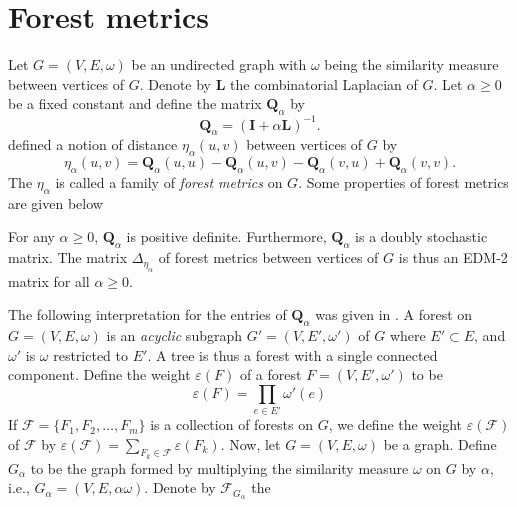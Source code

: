 \section{Forest metrics}
\label{sec:forest-metrics}
Let $G = (V,E,\omega)$ be an undirected graph with $\omega$ being the
similarity measure between vertices of $G$. Denote by $\mathbf{L}$ the
combinatorial Laplacian of $G$. Let $\alpha \geq 0$ be a fixed
constant and define the matrix $\mathbf{Q}_{\alpha}$ by
\begin{equation}
  \label{eq:30}
  \mathbf{Q}_{\alpha} = (\mathbf{I} + \alpha \mathbf{L})^{-1}.
\end{equation}
%
\citet{chebotarev02:_fores_metric_for_graph_vertic} defined a notion of
distance $\eta_\alpha(u,v)$ between vertices of $G$ by
\begin{equation}
  \label{eq:41}
  \eta_\alpha(u,v) = \mathbf{Q}_\alpha(u,u) - \mathbf{Q}_\alpha(u,v) -
  \mathbf{Q}_\alpha(v,u) + \mathbf{Q}_\alpha(v,v).
\end{equation}
The $\eta_{\alpha}$ is called a family of {\em forest metrics} \/ on
$G$.  Some properties of forest metrics are given below
\begin{theorem}
  \label{thm:4}
  For any $\alpha \geq 0$, $\mathbf{Q}_{\alpha}$ is positive
  definite. Furthermore, $\mathbf{Q}_{\alpha}$ is a doubly stochastic
  matrix. The matrix $\Delta_{\eta_{\alpha}}$ of forest metrics
  between vertices of $G$ is thus an EDM-2 matrix for all $\alpha \geq
  0$.
\end{theorem}
The following interpretation for the entries of $\mathbf{Q}_{\alpha}$
was given in \citet{chebotarev02:_fores_metric_for_graph_vertic}. A
forest on $G = (V,E,\omega)$ is an {\em acyclic} \/ subgraph $G' =
(V,E',\omega')$ of $G$ where $E' \subset E$, and $\omega'$ is $\omega$
restricted to $E'$. A tree is thus a forest with a single connected
component. Define the weight $\varepsilon(F)$ of a forest $F =
(V,E',\omega')$ to be
\begin{equation}
  \varepsilon(F) = \prod_{e \in E'}{\omega'(e)} 
\end{equation}
If $\mathscr{F} = \{F_1, F_2, \dots, F_m\}$ is a collection of forests
on $G$, we define the weight $\varepsilon(\mathscr{F})$ of
$\mathscr{F}$ by $\varepsilon(\mathscr{F}) = \sum_{F_k \in
  \mathscr{F}}{\varepsilon(F_k)}$. Now, let $G = (V,E,\omega)$ be a
graph. Define $G_\alpha$ to be the graph formed by multiplying the
similarity measure $\omega$ on $G$ by $\alpha$, i.e., $G_\alpha =
(V,E,\alpha \omega)$. Denote by $\mathscr{F}_{G_\alpha}$ the
